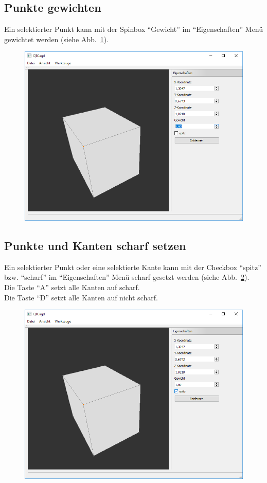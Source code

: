 \subsection{Punkte gewichten}
Ein selektierter Punkt kann mit der Spinbox "`Gewicht"' im "`Eigenschaften"' Menü gewichtet werden (siehe Abb.~\ref{fig:PunkteGewichten}).
\begin{figure}[ht!]
	\centering
	\includegraphics[scale=0.6]{content/pictures/6-PunkteGewichten}
	\caption{}
	\label{fig:PunkteGewichten}
\end{figure}
\subsection{Punkte und Kanten scharf setzen}
Ein selektierter Punkt oder eine selektierte Kante kann mit der Checkbox "`spitz"' bzw. "`scharf"' im "`Eigenschaften"' Menü scharf gesetzt werden (siehe Abb.~\ref{fig:Punkte-KantenScharfSetzen}).\\
Die Taste "`A"' setzt alle Kanten auf scharf.\\
Die Taste "`D"' setzt alle Kanten auf nicht scharf.\\
\begin{figure}[ht!]
	\centering
	\includegraphics[scale=0.6]{content/pictures/7-Punkte-KantenScharfSetzen}
	\caption{}
	\label{fig:Punkte-KantenScharfSetzen}
\end{figure}
